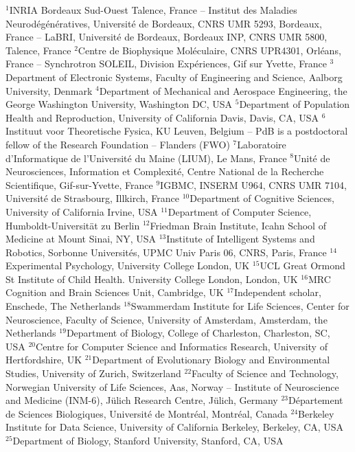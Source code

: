 $^{1}$INRIA Bordeaux Sud-Ouest Talence, France – Institut des Maladies Neurodégénératives, Université de Bordeaux, CNRS UMR 5293, Bordeaux, France – LaBRI, Université de Bordeaux, Bordeaux INP, CNRS UMR 5800, Talence, France
$^{2}$Centre de Biophysique Moléculaire, CNRS UPR4301, Orléans, France -- Synchrotron SOLEIL, Division Expériences, Gif sur Yvette, France
$^{3}$Department of Electronic Systems, Faculty of Engineering and Science, Aalborg University, Denmark
$^{4}$Department of Mechanical and Aerospace Engineering, the George Washington University, Washington DC, USA
$^{5}$Department of Population Health and Reproduction, University of California Davis, Davis, CA, USA
$^{6}$Instituut voor Theoretische Fysica, KU Leuven, Belgium -- PdB is a postdoctoral fellow of the Research Foundation -- Flanders (FWO)
$^{7}$Laboratoire d'Informatique de l'Université du Maine (LIUM), Le Mans, France
$^{8}$Unité de Neurosciences, Information et Complexité, Centre National de la Recherche Scientifique, Gif-sur-Yvette, France
$^{9}$IGBMC, INSERM U964, CNRS UMR 7104, Université de Strasbourg, Illkirch, France
$^{10}$Department of Cognitive Sciences, University of California Irvine, USA
$^{11}$Department of Computer Science, Humboldt-Universität zu Berlin
$^{12}$Friedman Brain Institute, Icahn School of Medicine at Mount Sinai, NY, USA
$^{13}$Institute of Intelligent Systems and Robotics, Sorbonne Universités, UPMC Univ Paris 06, CNRS, Paris, France
$^{14}$Experimental Psychology, University College London, UK
$^{15}$UCL Great Ormond St Institute of Child Health. University College London, London, UK
$^{16}$MRC Cognition and Brain Sciences Unit, Cambridge, UK
$^{17}$Independent scholar, Enschede, The Netherlands
$^{18}$Swammerdam Institute for Life Sciences, Center for Neuroscience, Faculty of Science, University of Amsterdam, Amsterdam, the Netherlands
$^{19}$Department of Biology, College of Charleston, Charleston, SC, USA
$^{20}$Centre for Computer Science and Informatics Research, University of Hertfordshire, UK
$^{21}$Department of Evolutionary Biology and Environmental Studies, University of Zurich, Switzerland
$^{22}$Faculty of Science and Technology, Norwegian University of Life Sciences, Aas, Norway -- Institute of Neuroscience and Medicine (INM-6), Jülich Research Centre, Jülich, Germany
$^{23}$Département de Sciences Biologiques, Université de Montréal, Montréal, Canada
$^{24}$Berkeley Institute for Data Science, University of California Berkeley, Berkeley, CA, USA
$^{25}$Department of Biology, Stanford University, Stanford, CA, USA
